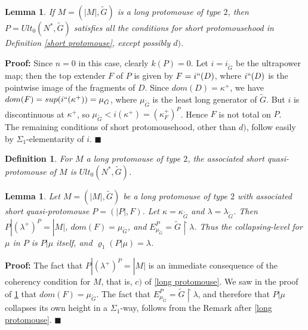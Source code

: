 \documentclass[12pt]{article}
\newtheorem{lem}[thm]{Lemma}
\newtheorem{defn}[thm]{Definition}
\begin{document}
\begin{lem} \label{lpt2 first ultrapower}
If $M = (|M| , \tilde{G})$ is a long protomouse of type $2$, then $P = Ult_0 (N^* , \tilde{G} )$ satisfies all the conditions for short protomousehood in Definition \ref{short protomouse}, except possibly $d)$.
\end{lem}

\textbf{Proof:}  Since $n = 0$ in this case, clearly $k(P) = 0$.  Let $i = i_{\tilde{G}}$ be the ultrapower map; then the top extender $F$ of $P$ is given by $F = i``(D)$, where $i``(D)$ is the pointwise image of the fragments of $D$.  Since $dom ( D) = \kappa^+$, we have $dom(F) = sup ( i `` ( \kappa^+)) = \mu_{\tilde{G}}$, where $\mu_{\tilde{G}}$ is the least long generator of $\tilde{G}$.  But $i$ is discontinuous at $\kappa^+ $, so $\mu_{\tilde{G}} < i(\kappa^+ ) = (\kappa_F^+)^P $.  Hence $F$ is not total on $P$.\\

The remaining conditions of short protomousehood, other than $d)$, follow easily by $\Sigma_1$-elementarity of $i$. $\blacksquare$\\

\begin{defn} \label{associated short quasi-protomouse}
For $M$ a long protomouse of type $2$, the associated short quasi-protomouse of $M$ is $Ult_0 (N^* , \tilde{G} )$.
\end{defn}

\begin{lem}
Let $M = (|M|, \tilde{G} )$ be a long protomouse of type $2$ with associated short quasi-protomouse $P = ( |P|, F )$.  Let $\kappa = \kappa_{\tilde{G}}$ and $\lambda = \lambda_{\tilde{G}}$.  Then $P | ( \lambda^+ )^P = |M|$, $dom(F) = \mu_{\tilde{G}}$, and $E_{\mu_{\tilde{G}}}^P = \tilde{G} \restriction \lambda$.  Thus the collapsing-level for $\mu$ in $P$ is $P | \mu$ itself, and $\varrho_1 (P | \mu) = \lambda$.
\end{lem}

\textbf{Proof:}  The fact that $P | ( \lambda^+ )^P = |M|$ is an immediate consequence of the coherency condition for $M$, that is, $c)$ of \ref{long protomouse}.  We saw in the proof of \ref{lpt2 first ultrapower} that $dom(F) = \mu_{\tilde{G}}$.  The fact that $E_{\mu_{\tilde{G}}}^P = \tilde{G} \restriction \lambda$, and therefore that $P | \mu$ collapses its own height in a $\Sigma_1$-way, follows from the Remark after \ref{long protomouse}. $\blacksquare$\\
\end{document}
